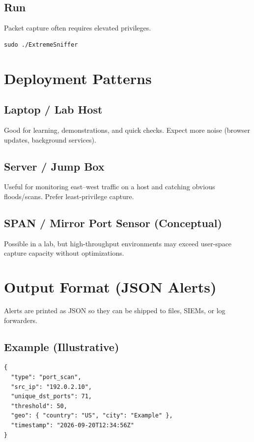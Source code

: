 \documentclass[14pt]{extarticle}
\begin{document}
\subsection{Run}
Packet capture often requires elevated privileges.
\begin{lstlisting}[caption={Example run command.},label={lst:run}]
sudo ./ExtremeSniffer
\end{lstlisting}

\section{Deployment Patterns}
\subsection{Laptop / Lab Host}
Good for learning, demonstrations, and quick checks. Expect more noise (browser updates, background services).

\subsection{Server / Jump Box}
Useful for monitoring east--west traffic on a host and catching obvious floods/scans. Prefer least-privilege capture.

\subsection{SPAN / Mirror Port Sensor (Conceptual)}
Possible in a lab, but high-throughput environments may exceed user-space capture capacity without optimizations.

\section{Output Format (JSON Alerts)}
Alerts are printed as JSON so they can be shipped to files, SIEMs, or log forwarders.

\subsection{Example (Illustrative)}
\begin{lstlisting}[caption={Illustrative alert example (fields may vary by build/config).},label={lst:json}]
{
  "type": "port_scan",
  "src_ip": "192.0.2.10",
  "unique_dst_ports": 71,
  "threshold": 50,
  "geo": { "country": "US", "city": "Example" },
  "timestamp": "2026-09-20T12:34:56Z"
}
\end{lstlisting}
\end{document}
